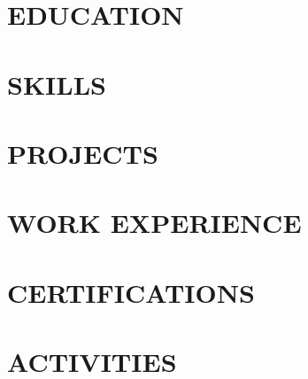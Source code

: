 \documentclass[10pt]{article}
\begin{document}
\pagestyle{others}\thispagestyle{first_page}



\section{EDUCATION}



\section{SKILLS}


\section{PROJECTS}



\section{WORK EXPERIENCE}


\section{CERTIFICATIONS}




\section{ACTIVITIES}

\end{document}
